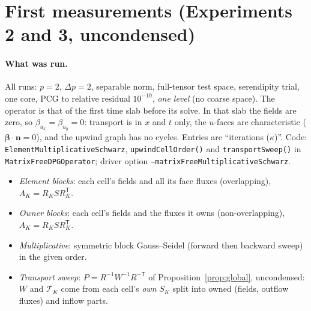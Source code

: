 \documentclass[11pt]{article}
\theoremstyle{remark}
\theoremstyle{definition}
\newcommand{\bbeta}{\boldsymbol{\beta}}
\newcommand{\bn}{\boldsymbol{n}}
\newcommand{\T}{\mathsf{T}}
\newcommand{\Tr}{\mathcal{T}}
\begin{document}
\section{First measurements (Experiments 2 and 3, uncondensed)}\label{sec:measurements}

\paragraph{What was run.}  All runs: $p=2$, $\Delta p=2$, separable norm, full-tensor test space, serendipity trial,
one core, PCG to relative residual $10^{-10}$, \emph{one level} (no coarse space).  The operator is that of the first
time slab before its solve.  In that slab the fields are zero, so $\beta_{u_x}=\beta_{u_y}=0$: transport is in $x$ and
$t$ only, the $u$-faces are characteristic ($\bbeta\cdot\bn=0$), and the upwind graph has no cycles.  Entries are
``iterations ($\kappa$)''.  Code: \texttt{ElementMultiplicativeSchwarz}, \texttt{upwindCellOrder()} and
\texttt{transportSweep()} in \texttt{MatrixFreeDPGOperator}; driver option \texttt{--matrixFreeMultiplicativeSchwarz}.

\begin{itemize}[nosep]
  \item \emph{Element blocks}: each cell's fields and all its face fluxes (overlapping), $A_K=R_KSR_K^\T$.
  \item \emph{Owner blocks}: each cell's fields and the fluxes it owns (non-overlapping), $A_K=R_KSR_K^\T$.
  \item \emph{Multiplicative}: symmetric block Gauss--Seidel (forward then backward sweep) in the given order.
  \item \emph{Transport sweep}: $P=R^{-1}W^{-1}R^{-\T}$ of Proposition~\ref{prop:global}, uncondensed: $W$ and $\Tr_K$
        come from each cell's \emph{own} $S_K$ split into owned (fields, outflow fluxes) and inflow parts.
\end{itemize}
\end{document}
